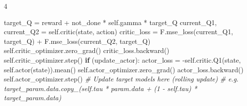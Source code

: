 \documentclass{article}
\newenvironment{Shaded}{\CodeFontSize\setlength{\topsep}{\CodeBlockSkip}\setlength{\partopsep}{0pt}}{}
\newcommand{\CommentTok}[1]{\textcolor[rgb]{0.38,0.63,0.69}{\textit{#1}}}
\newcommand{\ControlFlowTok}[1]{\textcolor[rgb]{0.00,0.44,0.13}{\textbf{#1}}}
\newcommand{\NormalTok}[1]{#1}
\newcommand{\OperatorTok}[1]{\textcolor[rgb]{0.40,0.40,0.40}{#1}}
\newcommand{\VariableTok}[1]{\textcolor[rgb]{0.10,0.09,0.49}{#1}}
\newcommand{\CodeFontSize}{\fontsize{3.6}{4}\selectfont}
\newlength{\CodeBlockSkip}
\newcommand{\NumCodeColumns}{4}  %
\begin{document}
\begin{multicols*}{\NumCodeColumns}
\begin{Shaded}
\begin{Highlighting}[]
\NormalTok{  target\_Q }\OperatorTok{=}\NormalTok{ reward }\OperatorTok{+}\NormalTok{ not\_done }\OperatorTok{*} \VariableTok{self}\NormalTok{.gamma }\OperatorTok{*}\NormalTok{ target\_Q}
\NormalTok{current\_Q1, current\_Q2 }\OperatorTok{=} \VariableTok{self}\NormalTok{.critic(state, action)}
\NormalTok{critic\_loss }\OperatorTok{=}\NormalTok{ F.mse\_loss(current\_Q1, target\_Q) }\OperatorTok{+}\NormalTok{ F.mse\_loss(current\_Q2, target\_Q)}
\VariableTok{self}\NormalTok{.critic\_optimizer.zero\_grad()}
\NormalTok{critic\_loss.backward()}
\VariableTok{self}\NormalTok{.critic\_optimizer.step()}
\ControlFlowTok{if}\NormalTok{ (update\_actor):}
\NormalTok{  actor\_loss }\OperatorTok{=} \OperatorTok{{-}}\VariableTok{self}\NormalTok{.critic.Q1(state, }\VariableTok{self}\NormalTok{.actor(state)).mean()}
  \VariableTok{self}\NormalTok{.actor\_optimizer.zero\_grad()}
\NormalTok{  actor\_loss.backward()}
  \VariableTok{self}\NormalTok{.actor\_optimizer.step()}
  \CommentTok{\# Update target models here (rolling update)}
  \CommentTok{\# e.g. target\_param.data.copy\_(self.tau * param.data + (1 {-} self.tau) * target\_param.data)}
\end{Highlighting}
\end{Shaded}


\end{multicols*}
\end{document}

